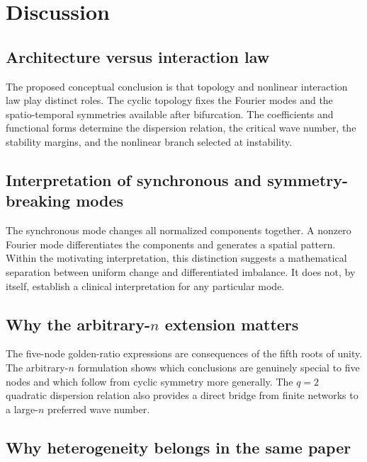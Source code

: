 \documentclass[11pt, reqno]{amsart}
\theoremstyle{definition}
\theoremstyle{remark}
\begin{document}
	\section{Discussion}
	\label{sec:discussion}
	
	\subsection{Architecture versus interaction law}
	
	The proposed conceptual conclusion is that topology and nonlinear interaction
	law play distinct roles.  The cyclic topology fixes the Fourier modes and the
	spatio-temporal symmetries available after bifurcation.  The coefficients and
	functional forms determine the dispersion relation, the critical wave number,
	the stability margins, and the nonlinear branch selected at instability.
	
	\subsection{Interpretation of synchronous and symmetry-breaking modes}
	
	The synchronous mode changes all normalized components together.  A nonzero
	Fourier mode differentiates the components and generates a spatial pattern.
	Within the motivating interpretation, this distinction suggests a mathematical
	separation between uniform change and differentiated imbalance.  It does not,
	by itself, establish a clinical interpretation for any particular mode.
	
	\subsection{Why the arbitrary-$n$ extension matters}
	
	The five-node golden-ratio expressions are consequences of the fifth roots of
	unity.  The arbitrary-$n$ formulation shows which conclusions are genuinely
	special to five nodes and which follow from cyclic symmetry more generally.
	The $q=2$ quadratic dispersion relation also provides a direct bridge from
	finite networks to a large-$n$ preferred wave number.
	
	\subsection{Why heterogeneity belongs in the same paper}
	
\end{document}
